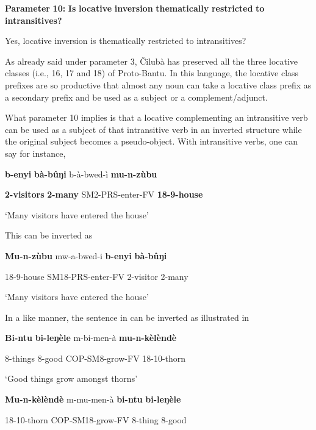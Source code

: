 \documentclass[output=paper]{langscibook}
\begin{document}
\textbf{Parameter} \textbf{10:} \textbf{Is} \textbf{locative} \textbf{inversion} \textbf{thematically} \textbf{restricted} \textbf{to} \textbf{intransitives?}

Yes, locative inversion is thematically restricted to intransitives?

As already said under parameter 3, Čilubà has preserved all the three locative classes (i.e., 16, 17 and 18) of Proto-Bantu. In this language, the locative class prefixes are so productive that almost any noun can take a locative class prefix as a secondary prefix and be used as a subject or a complement/adjunct. 

What parameter 10 implies is that a locative complementing an intransitive verb can be used as a subject of that intransitive verb in an inverted structure while the original subject becomes a pseudo-object. With intransitive verbs, one can say for instance,

\ea%
    \label{ex:lukusa:75}
    \z

           \textbf{b-enyi}    \textbf{bà-bûŋi}    b-à-bwed-ì        \textbf{mu-n-zùbu} 

\textbf{2-visitors}  \textbf{2-many}    SM2-PRS-enter-FV  \textbf{18-9-house} 

\glt ‘Many visitors have entered the house’

This can be inverted as

\ea%
    \label{ex:lukusa:76}
    \z

          \textbf{Mu-n-zùbu}      mw-a-bwed-i        \textbf{b-enyi}    \textbf{bà-bûŋi} 

18-9-house      SM18-PRS-enter-FV    2-visitor    2-many

\glt ‘Many visitors have entered the house’

In a like manner, the sentence in  can be inverted as illustrated in 

\ea%
    \label{ex:lukusa:77}
    \z

           \textbf{Bi-ntu}    \textbf{bi-leŋèle}  m-bi-men-à      \textbf{mu-n-kèlèndè} 

8-things    8-good    COP-SM8-grow-FV  18-10-thorn

\glt ‘Good things grow amongst thorns’

\ea%
    \label{ex:lukusa:78}
    \z

           \textbf{Mu-n-kèlèndè}    m-mu-men-à        \textbf{bi-ntu}    \textbf{bi-leŋèle} 

18-10-thorn    COP-SM18-grow-FV    8-thing    8-good
\end{document}
